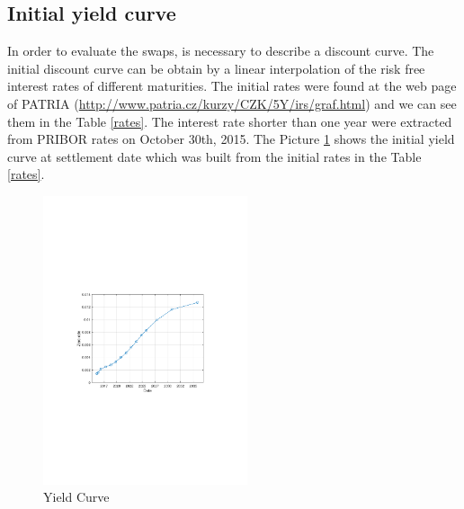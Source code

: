 \documentclass{amsart}
\theoremstyle{definition}\newtheorem{definition}[theorem]{Definition}
\theoremstyle{remark}\newtheorem{remark}[theorem]{Remark}
\begin{document}
\subsection{Initial yield curve}
In order to evaluate the swaps, is necessary to describe a discount curve. The initial discount curve can be obtain by a linear interpolation of the risk free interest rates of different maturities. The initial rates were found at the web page of PATRIA (\href{URL}{http://www.patria.cz/kurzy/CZK/5Y/irs/graf.html}) and we can see them in the Table \ref{rates}.%
The interest rate shorter than one year were extracted from PRIBOR rates on October 30th, 2015. 
The Picture \ref{YieldCurve} shows the initial yield curve at settlement date which was built from the initial rates in the Table \ref{rates}.
\begin{table}
\caption{Initial rates}
\label{rates}
\end{table}


\begin{figure}[!htbp]
  \centering 
	\includegraphics[width=6cm, clip, trim= 110 270 110 270]{IMG/YieldCurve.pdf}
  \caption{Yield Curve}  \label{YieldCurve}
\end{figure}
\end{document}
